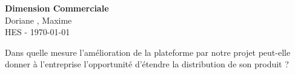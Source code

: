 \begin{titlepage} 
	\begin{center}
		\Huge{\textbf{Dimension Commerciale}}\\
		\vspace{0,5cm}
		\large {Doriane , Maxime }\\
		\vspace{0,5cm}
		\large {HES - \today}
	
		\vfill 

		\huge{Dans quelle mesure l'amélioration de la plateforme par notre projet peut-elle donner à l'entreprise l'opportunité d'étendre la distribution de son produit ?}

		\vfill 
	
	\end{center}
\end{titlepage}